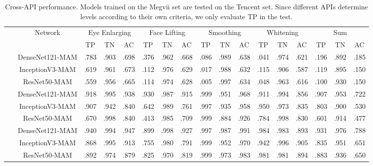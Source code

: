 \documentclass[sigconf]{acmart}
\begin{document}
\begin{table}
\begin{center}
   \caption{Cross-API performance. Models trained on the Megvii set are tested on the Tencent set. Since different APIs determine levels according to their own criteria, we only evaluate TP in the test.}
   \label{table:cross_tencent}
\begin{tabular}{c|c|ccc|ccc|ccc|ccc|ccc}
\hline 
&\multirow{2}{*}{Network}&\multicolumn{3}{c}{Eye Enlarging} &\multicolumn{3}{c}{Face Lifting}&\multicolumn{3}{c}{Smoothing} &\multicolumn{3}{c}{Whitening} &\multicolumn{3}{c}{Sum}\\\
& & TP & TN & AC & TP & TN & AC & TP & TN & AC & TP & TN & AC & TP & TN & AC
\\
\hline  \hline
\multirow{3}{*}{\rotatebox{90}{Direct}} & DenseNet121-MAM &.783 &.903 &.698 &.376 &.962 &.668 &.086 &.989 &.638 &.041 &.974 &.621 &.196 &.892 &.185\\
& InceptionV3-MAM &.619 &.961 &.673 &.112 &.976 &.629 &.017 &.988 &.632 &.115 &.906 &.587 &.119 &.895 &.150\\
& ResNet50-MAM &.559 &.956 &.665 &.114 &.974 &.628 &.005 &.997 &.634 &.048 &.963 &.616 &.100 &.930 &.150\\
\hline  \hline
\multirow{3}{*}{\rotatebox{90}{Finetune}} & DenseNet121-MAM &.918 &.995 &.938 &.930 &.987 &.915 &.999 &.951 &.968 &.911 &.994 &.856 &.907 &.953 &.722\\
& InceptionV3-MAM &.907 &.942 &.840 &.642 &.989 &.761 &.997 &.935 &.958 &.950 &.973 &.835 &.803 &.900 &.530\\
& ResNet50-MAM &.670 &.998 &.840 &.413 &.985 &.709 &.999 &.884 &.926 &.784 &.998 &.830 &.601 &.914 &.477\\
\hline  \hline
\multirow{3}{*}{\rotatebox{90}{Full}} & DenseNet121-MAM &.940 &.994 &.947 &.899 &.998 &.927 &.997 &.987 &.991 &.984 &.983 &.893 &.931 &.976 &.788\\
& InceptionV3-MAM &.868 &.995 &.913 &.755 &.980 &.791 &.999 &.952 &.970 &.942 &.996 &.905 &.835 &.951 &.651\\
& ResNet50-MAM &.892 &.974 &.879 &.825 &.970 &.819 &.999 &.973 &.983 &.981 &.981 &.894 &.883 &.936 &.650\\
\hline 
\hline
\end{tabular}
\end{center}
\end{table}
\end{document}
